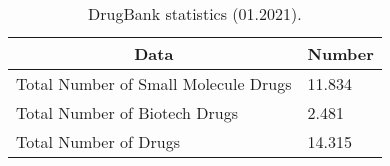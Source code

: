 \begin{table}
\caption{DrugBank statistics (01.2021).}
\centering
\begin{tabular}{|l|l|}
\hline
\multicolumn{1}{|c|}{\textbf{Data}}  & \multicolumn{1}{c|}{\textbf{Number}} \\ \hline
Total Number of Small Molecule Drugs & 11.834                               \\ \hline
Total Number of Biotech Drugs        & 2.481                                \\ \hline
Total Number of Drugs                & 14.315                               \\ \hline
\end{tabular}
\label{tab:drugbank_stats}
\end{table}